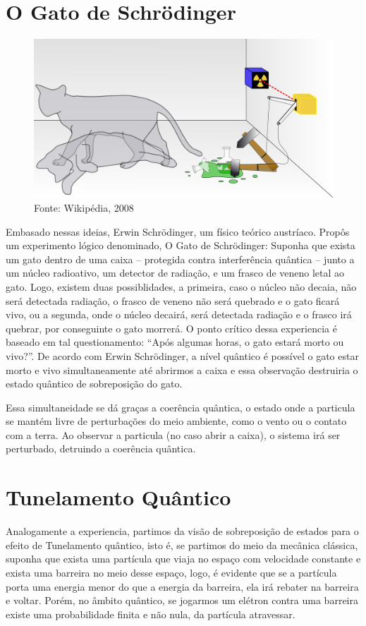 \documentclass[
	12pt,				%
	oneside,			%
	a4paper,			%
	english,			%
	french,				%
	spanish,			%
	brazil,				%
	]{abntex2}
\begin{document}
\section{O Gato de Schrödinger}

\begin{figure}[ht!]
	\centering \includegraphics[width=\linewidth]{sobreposicao.jpg}
	\caption{Fonte: Wikipédia, 2008}
	\label{fig:gato}
\end{figure}

Embasado nessas ideias, Erwin Schrödinger, um físico teórico austríaco. Propôs um experimento lógico denominado, O Gato de Schrödinger: Suponha que exista um gato dentro de uma caixa – protegida contra interferência quântica – junto a um núcleo radioativo, um detector de radiação,  e um frasco de veneno letal ao gato. Logo, existem duas possiblidades, a primeira, caso o núcleo não decaia, não será detectada radiação, o frasco de veneno não será quebrado e o gato ficará vivo, ou a segunda, onde o núcleo decairá, será detectada radiação e o frasco irá quebrar, por conseguinte o gato morrerá. O ponto crítico dessa experiencia é baseado em tal questionamento: “Após algumas horas, o gato estará morto ou vivo?”. De acordo com Erwin Schrödinger, a nível quântico é possível o gato estar morto e vivo simultaneamente até abrirmos a caixa e essa observação destruiria o estado quântico de sobreposição do gato.

Essa simultaneidade se dá graças a coerência quântica, o estado onde a particula se mantém livre de perturbações do meio ambiente, como o vento ou o contato com a terra. Ao observar a particula (no caso abrir a caixa), o sistema irá ser perturbado, detruindo a coerência quântica.

\section{Tunelamento Quântico}
Analogamente a experiencia, partimos da visão de sobreposição de estados para o efeito de Tunelamento quântico, isto é, se partimos do meio da mecânica clássica, suponha que exista uma partícula que viaja no espaço com velocidade constante e exista uma barreira no meio desse espaço, logo, é evidente que se a partícula porta uma energia menor do que a energia da barreira, ela irá rebater na barreira e voltar. Porém, no âmbito quântico, se jogarmos um elétron contra uma barreira existe uma probabilidade finita e não nula, da partícula atravessar. 
\end{document}
